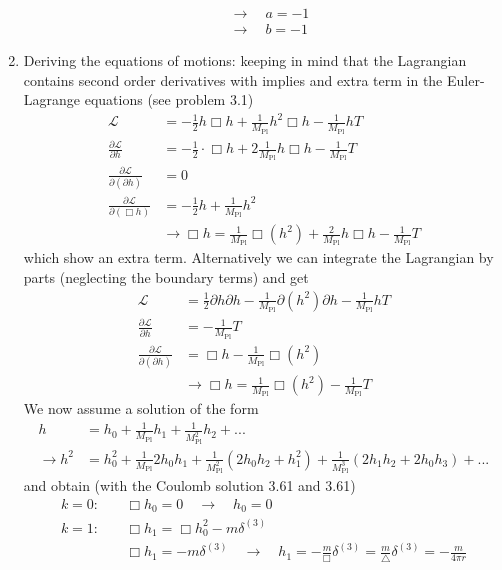 \documentclass[10pt,a4paper]{book}
\theoremstyle{definition}
\begin{document}
\begin{enumerate}[label=(\alph*)]
\begin{align}
&\rightarrow\quad a=-1\\
&\rightarrow\quad b=-1
\end{align} 
\item Deriving the equations of motions: keeping in mind that the Lagrangian contains second order derivatives with implies and extra term in the Euler-Lagrange equations (see problem 3.1)
\begin{align}
\mathcal{L}&=-\frac{1}{2}h\Box h+\frac{1}{M_\text{Pl}}h^2\Box h-\frac{1}{M_\text{Pl}}hT\\
\frac{\partial\mathcal{L}}{\partial h}&=-\frac{1}{2}\cdot\Box h+2\frac{1}{M_\text{Pl}}h\Box h-\frac{1}{M_\text{Pl}}T\\
\frac{\partial\mathcal{L}}{\partial(\partial h)}&=0\\
\frac{\partial\mathcal{L}}{\partial(\Box h)}&=-\frac{1}{2}h+\frac{1}{M_\text{Pl}}h^2\\
&\rightarrow\Box h=\frac{1}{M_\text{Pl}}\Box(h^2)+\frac{2}{M_\text{Pl}}h\Box h-\frac{1}{M_\text{Pl}}T
\end{align}
which show an extra term. Alternatively we can integrate the Lagrangian by parts (neglecting the boundary terms) and get
\begin{align}
\mathcal{L}&=\frac{1}{2}\partial h\partial h-\frac{1}{M_\text{Pl}}\partial(h^2)\partial h-\frac{1}{M_\text{Pl}}hT\\
\frac{\partial\mathcal{L}}{\partial h}&=-\frac{1}{M_\text{Pl}}T\\
\frac{\partial\mathcal{L}}{\partial(\partial h)}&=\Box h-\frac{1}{M_\text{Pl}}\Box(h^2)\\
&\rightarrow\Box h=\frac{1}{M_\text{Pl}}\Box(h^2)-\frac{1}{M_\text{Pl}}T
\end{align}
We now assume a solution of the form
\begin{align}
h&=h_0+\frac{1}{M_\text{Pl}}h_1+\frac{1}{M_\text{Pl}^2}h_2+...\\
\rightarrow h^2&=h_0^2+\frac{1}{M_\text{Pl}}2h_0h_1+\frac{1}{M_\text{Pl}^2}(2h_0h_2+h_1^2)+\frac{1}{M_\text{Pl}^3}(2h_1h_2+2h_0h_3)+...
\end{align}
and obtain (with the Coulomb solution 3.61 and 3.61)
\begin{align}
k=0:&\quad\Box h_0=0\quad\rightarrow\quad h_0=0\\
k=1:&\quad\Box h_1=\Box h_0^2-m\delta^{(3)}\\
    &\quad\Box h_1=-m\delta^{(3)}\quad\rightarrow\quad h_1=-\frac{m}{\Box}\delta^{(3)}=\frac{m}{\triangle}\delta^{(3)}=-\frac{m}{4\pi r}\\

\end{align}
\end{enumerate}
\end{document}
